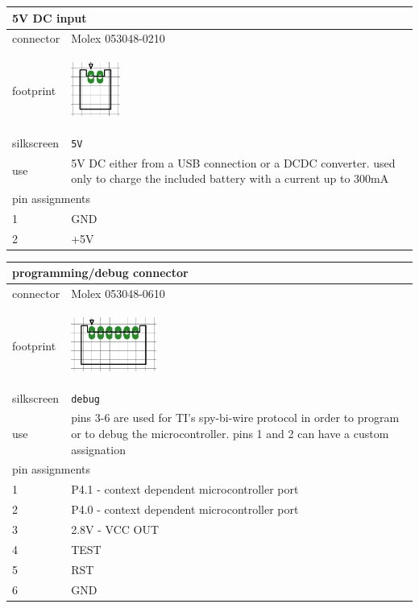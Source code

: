 \documentclass[a4paper,twoside]{refart}
\begin{document}
\begin{tabular}{ |l|p{8cm}| }
    \hline
    \multicolumn{2}{|l|}{5V DC input} \\
    \hline
        connector & Molex 053048-0210 \\
        footprint & \begin{center} \includegraphics[height=50pt]{img/con2} \end{center} \\ \hline
        silkscreen & \verb"5V" \\ \hline
        use & 5V DC either from a USB connection or a DCDC converter. used only to charge the included battery with a current up to 300mA \\
    \hline
    \multicolumn{2}{|l|}{pin assignments} \\
    \hline
        1   &   GND \\
        2   &   +5V \\
    \hline
\end{tabular}

\begin{tabular}{ |l|p{8cm}| }
    \hline
    \multicolumn{2}{|l|}{programming/debug connector} \\
    \hline
        connector & Molex 053048-0610 \\
        footprint & \begin{center} \includegraphics[height=50pt]{img/con6} \end{center} \\ \hline
        silkscreen & \verb"debug" \\ \hline
        use & pins 3-6 are used for TI's spy-bi-wire protocol in order to program or to debug the microcontroller. pins 1 and 2 can have a custom assignation \\
    \hline
    \multicolumn{2}{|l|}{pin assignments} \\
    \hline
        1   &   P4.1 - context dependent microcontroller port \\
        2   &   P4.0 - context dependent microcontroller port \\
        3   &   2.8V - VCC OUT \\
        4   &   TEST \\
        5   &   RST \\
        6   &   GND \\
    \hline
\end{tabular}
\end{document}
